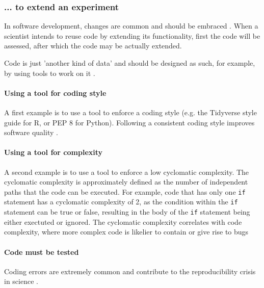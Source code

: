 \subsubsection{... to extend an experiment}

In software development, 
changes are common and should be embraced \cite{beck2000extreme}.
When a scientist intends to reuse code by extending its functionality,
first the code will be assessed,
after which the code may be actually extended.




Code is just 'another kind of data' and should be designed 
as such, for example, by using tools to work on it \cite{wilson2022twelve}.

\paragraph{Using a tool for coding style}

A first example is to use a tool to enforce a coding style 
(e.g. the Tidyverse style guide \cite{wickham2019advanced} for R,
or PEP 8 \cite{van2001pep} for Python).
Following a consistent coding style improves software quality \cite{fang2001}.

\paragraph{Using a tool for complexity}

A second example is to use a tool to enforce a low cyclomatic complexity.
The cyclomatic complexity is approximately defined 
as the number of independent paths that
the code can be executed. 
For example, code that has only one \verb|if| statement
has a cyclomatic complexity of 2, as the condition within the \verb|if|
statement can be true or false,
resulting in the body of the \verb|if| statement being either
exectuted or ignored.
The cyclomatic complexity correlates with code complexity,
where more complex code is likelier to contain or give rise to bugs 
\cite{abd2018calculating,chen2019empirical,zimmermann2008predicting}

\paragraph{Code must be tested}

Coding errors are extremely common 
and contribute to the reproducibility crisis in science \cite{vable2021code}.

